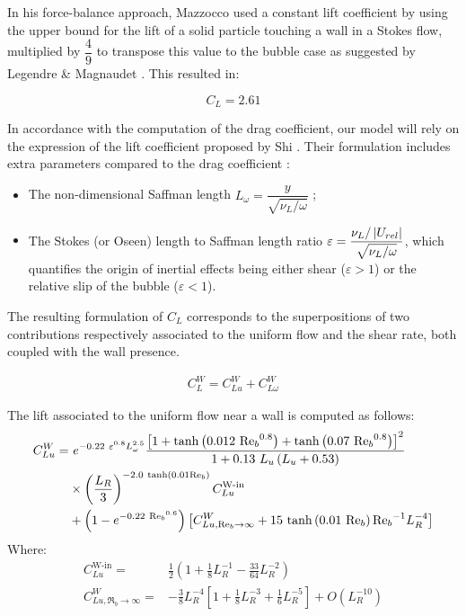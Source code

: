 In his force-balance approach, Mazzocco \etal \cite{mazzocco_reassessed_2018} used a constant lift coefficient by using the upper bound for the lift of a solid particle touching a wall in a Stokes flow, multiplied by $\dfrac{4}{9}$ to transpose this value to the bubble case as suggested by Legendre \& Magnaudet \cite{legendre_lift_1998}. This resulted in:

\begin{equation}
C_{L} = 2.61
\end{equation}


\npar

In accordance with the computation of the drag coefficient, our model will rely on the expression of the lift coefficient proposed by Shi \etal \cite{shi_drag_2021}. Their formulation includes extra parameters compared to the drag coefficient :
\begin{itemize}
\item The non-dimensional Saffman length $L_{\omega} = \dfrac{y}{\sqrt{\nu_{L} / \omega}}$ ;
\item The Stokes (or Oseen) length to Saffman length ratio $\varepsilon = \dfrac{\nu_{L} / \left| U_{rel} \right|}{\sqrt{\nu_{L} / \omega}}$, which quantifies the origin of inertial effects being either shear ($\varepsilon >1$) or the relative slip of the bubble ($\varepsilon < 1$).

\end{itemize}  

The resulting formulation of $C_{L}$ corresponds to the superpositions of two contributions respectively associated to the uniform flow and the shear rate, both coupled with the wall presence. 

\begin{align}
C_{L}^{W} =C_{Lu}^{W} + C_{L\omega}^{W}
\label{eq:lift_shi}
\end{align}



The lift associated to the uniform flow near a wall is computed as follows:
\begin{align}
\nonumber C_{Lu}^{W} =&\  e^{-0.22\ \varepsilon^{0.8}L_{\omega}^{2.5}} \frac{ \crocht{1 + \tanh{0.012\ {\Re_{b}}^{0.8}} + \tanh{0.07\ {\Re_{b}}^{0.8}} }^{2} } {1+0.13\ L_{u} \parth{L_{u}+0.53} } \\
%
\nonumber			&\times  \parth{\frac{L_{R}}{3}}^{-2.0\ \tanh{0.01\Re_{b}}}  C_{Lu}^{\text{W-in}}\\
%
&+\parth{1-e^{-0.22\ {\Re_{b}}^{0.6}} } \crocht{ C_{Lu,\Re_{b}\to \infty}^{W} + 15\ \tanh{ 0.01\ \Re_{b} }{\Re_{b}}^{-1} L_{R}^{-4} }
%
\end{align}
Where:
\begin{align}
C_{Lu}^{\text{W-in}}=&\frac{1}{2}\left(1+\frac{1}{8}L_{R}^{-1}-\frac{33}{64}L_{R}^{-2}\right)\\
%
C_{Lu, \Re_{b} \to \infty}^{W} = & -\frac{3}{8}L_{R}^{-4}\left[1+\frac{1}{8}L_{R}^{-3}+\frac{1}{6}L_{R}^{-5}\right] + O\left(L_{R}^{-10}\right)
\end{align}


